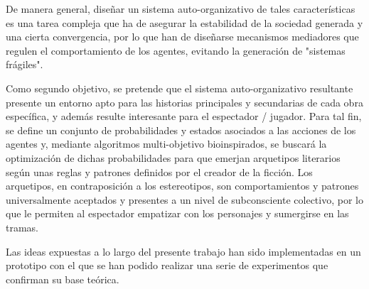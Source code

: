 \begin{resumen}
De manera general, diseñar un sistema auto-organizativo de tales características es una tarea compleja que ha de asegurar la estabilidad de la sociedad generada y una cierta convergencia, por lo que han de diseñarse mecanismos mediadores que regulen el comportamiento de los agentes, evitando la generación de "sistemas frágiles".

Como segundo objetivo, se pretende que el sistema auto-organizativo resultante presente un entorno apto para las historias principales y secundarias de cada obra específica, y además resulte interesante para el espectador / jugador. Para tal fin, se define un conjunto de probabilidades y estados asociados a las acciones de los agentes y, mediante algoritmos multi-objetivo bioinspirados, se buscará la optimización de dichas probabilidades para que emerjan arquetipos literarios según unas reglas y patrones definidos por el creador de la ficción. Los arquetipos, en contraposición a los estereotipos, son comportamientos y patrones universalmente aceptados y presentes a un nivel de subconsciente colectivo, por lo que le permiten al espectador empatizar con los personajes y sumergirse en las tramas. 



Las ideas expuestas a lo largo del presente trabajo han sido implementadas en un prototipo con el que se han podido realizar una serie de experimentos que confirman su base teórica.  





\end{resumen}






